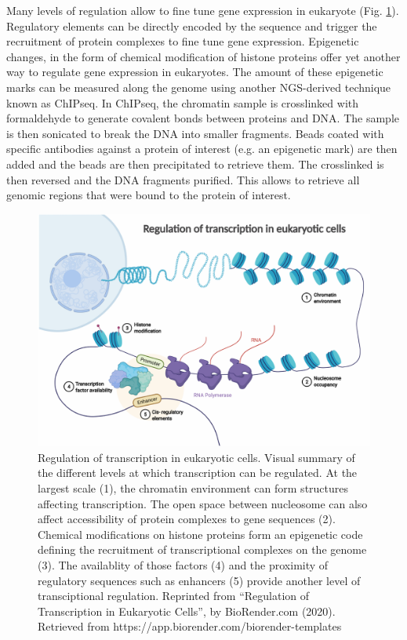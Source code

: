 Many levels of regulation allow to fine tune gene expression in eukaryote (Fig. \ref{fig:01-02:transcriptional-regulation}). Regulatory elements can be directly encoded by the sequence and trigger the recruitment of protein complexes to fine tune gene expression. Epigenetic changes, in the form of chemical modification of histone proteins offer yet another way to regulate gene expression in eukaryotes. The amount of these epigenetic marks can be measured along the genome using another NGS-derived technique known as \acrfull{ChIPseq}. In \acrshort{ChIPseq}, the chromatin sample is crosslinked with formaldehyde to generate covalent bonds between proteins and DNA. The sample is then sonicated to break the DNA into smaller fragments. Beads coated with specific antibodies against a protein of interest (e.g. an epigenetic mark) are then added and the beads are then precipitated to retrieve them. The crosslinked is then reversed and the DNA fragments purified. This allows to retrieve all genomic regions that were bound to the protein of interest. 

\begin{figure}
    \includegraphics[width=\textwidth]{Parts/Part01/gfx/transcriptional_regulation_levels.pdf}
    \caption{Regulation of transcription in eukaryotic cells. Visual summary of the different levels at which transcription can be regulated. At the largest scale (1), the chromatin environment can form structures affecting transcription. The open space between nucleosome can also affect accessibility of protein complexes to gene sequences (2). Chemical modifications on histone proteins form an epigenetic code defining the recruitment of transcriptional complexes on the genome (3). The availablity of those factors (4) and the proximity of regulatory sequences such as enhancers (5) provide another level of transciptional regulation. Reprinted from “Regulation of Transcription in Eukaryotic Cells”, by BioRender.com (2020). Retrieved from https://app.biorender.com/biorender-templates }
    \label{fig:01-02:transcriptional-regulation}
\end{figure}


